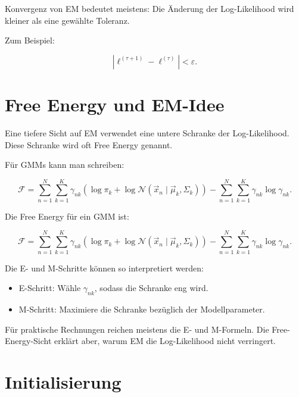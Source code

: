 \begin{notebox}
Konvergenz von EM bedeutet meistens:
Die Änderung der Log-Likelihood wird kleiner als eine gewählte Toleranz.

Zum Beispiel:

\[
    |\ell^{(\tau+1)}-\ell^{(\tau)}|<\varepsilon.
\]
\end{notebox}

\section{Free Energy und EM-Idee}

Eine tiefere Sicht auf EM verwendet eine untere Schranke der Log-Likelihood.
Diese Schranke wird oft Free Energy genannt.

Für GMMs kann man schreiben:

\[
    \mathcal{F}
    =
    \sum_{n=1}^{N}
    \sum_{k=1}^{K}
    \gamma_{nk}
    \left(
        \log \pi_k
        +
        \log
        \mathcal{N}(\vec{x}_n\mid\vec{\mu}_k,\Sigma_k)
    \right)
    -
    \sum_{n=1}^{N}
    \sum_{k=1}^{K}
    \gamma_{nk}
    \log \gamma_{nk}.
\]

\begin{definitionbox}
Die Free Energy für ein GMM ist:

\[
    \mathcal{F}
    =
    \sum_{n=1}^{N}
    \sum_{k=1}^{K}
    \gamma_{nk}
    \left(
        \log \pi_k
        +
        \log
        \mathcal{N}(\vec{x}_n\mid\vec{\mu}_k,\Sigma_k)
    \right)
    -
    \sum_{n=1}^{N}
    \sum_{k=1}^{K}
    \gamma_{nk}
    \log \gamma_{nk}.
\]
\end{definitionbox}

Die E- und M-Schritte können so interpretiert werden:

\begin{itemize}
    \item E-Schritt:
    Wähle \(\gamma_{nk}\), sodass die Schranke eng wird.
    \item M-Schritt:
    Maximiere die Schranke bezüglich der Modellparameter.
\end{itemize}

\begin{notebox}
Für praktische Rechnungen reichen meistens die E- und M-Formeln.
Die Free-Energy-Sicht erklärt aber, warum EM die Log-Likelihood nicht verringert.
\end{notebox}

\section{Initialisierung}

